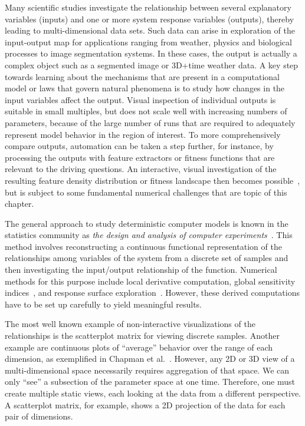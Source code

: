


Many scientific studies investigate the relationship between
several explanatory variables (inputs) and one or more system response
variables (outputs), thereby leading to multi-dimensional data sets.  Such data
can arise in exploration of the input-output map for applications ranging from
weather, physics and biological processes to image segmentation systems.  
In these cases, the output
is actually a complex object such as a segmented image or 3D+time weather data.
A key step towards learning about the mechanisms that are present in a
computational model or laws that govern natural phenomena is to study how
changes in the input variables affect the output.  Visual inspection of
individual outputs is suitable in small multiples, but does not scale well with
increasing numbers of parameters, because of the large number of runs that are
required to adequately represent model behavior in the region of interest.  To
more comprehensively compare outputs, automation can be taken a step further,
for instance, by processing the outputs with feature extractors or fitness
functions that are relevant to the driving questions.  An interactive, visual
investigation of the resulting feature density distribution or fitness
landscape then becomes
possible~\cite{Feiner:1990,Muhlbacher:2013,Piringer:2010}, but is subject to 
some fundamental numerical
challenges that are topic of this chapter.

The general approach to
study deterministic computer models is known in the statistics community as
\emph{the design and analysis of computer experiments}~\cite{Santner:2003}.
This method involves reconstructing a continuous functional representation of
the relationships among variables of the system from a discrete set of 
samples and then investigating the
input/output relationship of the function.  Numerical methods for
this purpose include local derivative computation, global sensitivity
indices~\cite{Saltelli:2008}, and response surface
exploration~\cite{Box:2007}.  However, these derived computations have to be
set up carefully to yield meaningful results. 

The most well known example of non-interactive visualizations of the 
relationships is the scatterplot 
matrix for viewing discrete samples.
Another example are continuous plots of ``average'' behavior over the 
range of each
dimension, as exemplified in Chapman et al.~\cite{Chapman:1994}.
However, any 2D or 3D view of a multi-dimensional space necessarily requires
aggregation of that space.
We can only ``see'' a subsection of the parameter
space at one time.
Therefore, one must create multiple static views, each looking at 
the data from a different perspective.  A scatterplot matrix, for example,
shows a 2D projection of the data for each pair of dimensions.


